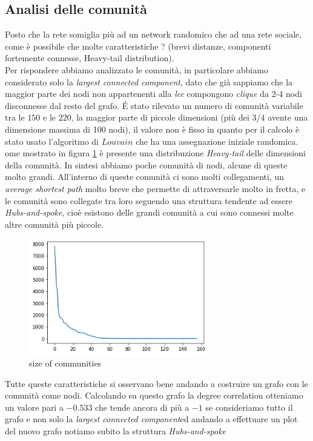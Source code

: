 \documentclass[a4paper]{article}
\newcommand{\lcc}{\textit{largest connected component}}
\begin{document}
\subsection{Analisi delle comunità}
Posto che la rete somiglia più ad un network randomico che ad una rete sociale, come è possibile che molte caratteristiche ? (brevi distanze, componenti fortemente connesse, Heavy-tail distribution).\\
Per rispondere abbiamo analizzato le comunità, in particolare abbiamo considerato solo la \lcc, dato che già sappiamo che la maggior parte dei nodi non appartenenti alla \textit{lcc} compongono \textit{clique} da 2-4 nodi disconnesse dal resto del grafo.
É stato rilevato un numero di comunità variabile tra le $150 \text{ e le } 220$, la maggior parte di piccole dimensioni (più dei 3/4 avente una dimensione massima di 100 nodi), il valore non è fisso in quanto per il calcolo è stato usato l'algoritmo di $Louvain$ che ha una assegnazione iniziale randomica.
ome mostrato in figura \ref{FIG:communities_sizes} è presente una distribuzione \textit{Heavy-tail} delle dimensioni della comunità.
In sintesi abbiamo poche comunità di nodi, alcune di queste molto grandi.
All'interno di queste comunità ci sono molti collegamenti, un \textit{average shortest path} molto breve che permette di attraversarle molto in fretta, e le comunità sono collegate tra loro seguendo una struttura tendente ad essere \textit{Hubs-and-spoke}, cioè esistono delle grandi comunità a cui sono connessi molte altre comunità più piccole. \\
\begin{figure}[!ht]
\centering
\includegraphics[width=0.7\textwidth]{community_size.png}
\caption{size of communities} \label{FIG:communities_sizes}
\end{figure}
\newpage
Tutte queste caratteristiche si osservano bene andando a costruire un grafo con le comunità come nodi.
Calcolando su questo grafo la degree correlation otteniamo un valore pari a $-0.533$ che tende ancora di più a $-1$ se consideriamo tutto il grafo e non solo la \lcc ed andando a effettuare un plot del nuovo grafo notiamo subito la struttura \textit{Hubs-and-spoke}
\end{document}
